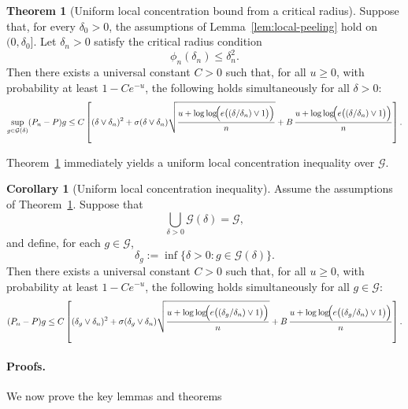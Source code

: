 \documentclass[11pt]{article}
\theoremstyle{plain}
\theoremstyle{definition} %
\newtheorem{theorem}{Theorem}
\newtheorem{corollary}{Corollary}
\begin{document}
\begin{theorem}[Uniform local concentration bound from a critical radius]
\label{cor:local-peeling-critical-radius}
Suppose that, for every \(\delta_0>0\), the assumptions of
Lemma~\ref{lem:local-peeling} hold on \((0,\delta_0]\). Let \(\delta_n>0\)
satisfy the critical radius condition
\[
\phi_n(\delta_n)\le \delta_n^2.
\]
Then there exists a universal constant \(C>0\) such that, for all \(u\ge 0\),
with probability at least \(1-C e^{-u}\), the following holds
simultaneously for all \(\delta>0\):
\[
\sup_{g\in\mathcal G(\delta)} (P_n-P)g
\le
C\left[
(\delta\vee\delta_n)^2
+
\sigma(\delta\vee\delta_n)
\sqrt{\frac{u+\log\log\!\Bigl(e\bigl((\delta/\delta_n)\vee 1\bigr)\Bigr)}{n}}
+
B\,\frac{u+\log\log\!\Bigl(e\bigl((\delta/\delta_n)\vee 1\bigr)\Bigr)}{n}
\right].
\]
\end{theorem}

Theorem~\ref{cor:local-peeling-critical-radius} immediately yields a uniform local concentration inequality over \(\mathcal{G}\).

\begin{corollary}[Uniform local concentration inequality]
Assume the assumptions of Theorem~\ref{cor:local-peeling-critical-radius}. Suppose that
\[
\bigcup_{\delta>0}\mathcal G(\delta)=\mathcal G,
\]
and define, for each \(g\in\mathcal G\),
\[
\delta_g:=\inf\{\delta>0:g\in\mathcal G(\delta)\}.
\]
Then there exists a universal constant \(C>0\) such that, for all \(u\ge 0\), with probability at least \(1-C e^{-u}\), the following holds simultaneously for all \(g\in\mathcal G\):
\[
(P_n-P)g
\le
C\left[
(\delta_g\vee\delta_n)^2
+
\sigma(\delta_g\vee\delta_n)
\sqrt{\frac{u+\log\log\!\Bigl(e\bigl((\delta_g/\delta_n)\vee 1\bigr)\Bigr)}{n}}
+
B\,\frac{u+\log\log\!\Bigl(e\bigl((\delta_g/\delta_n)\vee 1\bigr)\Bigr)}{n}
\right].
\]
\end{corollary}

 

\paragraph{Proofs.} We now prove the key lemmas and theorems
\end{document}
